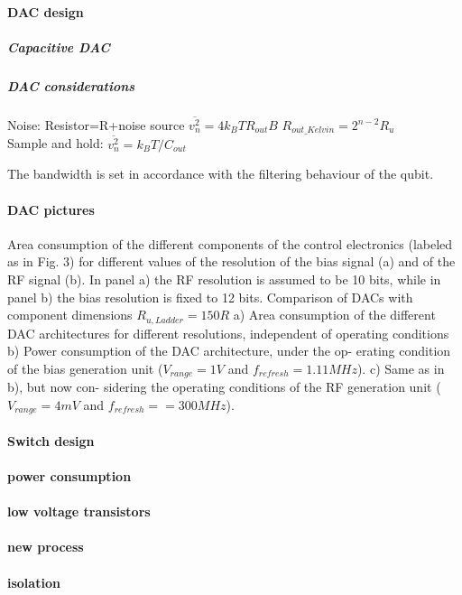\documentclass[a4paper,12pt]{article} %
\begin{document}
\paragraph{DAC design}
\subparagraph{Capacitive DAC}
\subparagraph{DAC considerations} Noise: Resistor=R+noise source  $ \overline{v_n^2} = 4k_BTR_{out}B  $ \hspace{2mm}
$R_{out\_Kelvin}=2^{n-2}R_u$ \\
Sample and hold: $\overline{v_n^2} = k_BT/C_{out}$


The bandwidth is set in accordance with the filtering behaviour of the qubit.


\paragraph{DAC pictures}
Area consumption of the different components of the
control electronics (labeled as in Fig. 3) for different values of
the resolution of the bias signal (a) and of the RF signal (b).
In panel a) the RF resolution is assumed to be 10 bits, while
in panel b) the bias resolution is fixed to 12 bits.
Comparison of DACs with component dimensions
 $R_{u,Ladder} = 150R$
a) Area consumption of the different DAC architectures for
different resolutions, independent of operating conditions b)
Power consumption of the DAC architecture, under the op-
erating condition of the bias generation unit ($V_{range} = 1 V$
and $f_{refresh} = 1.11 MHz$). c) Same as in b), but now con-
sidering the operating conditions of the RF generation unit
($V_{range} = 4 mV$ and $f_{refresh} = = 300 MHz$).

\paragraph{Switch design}

\paragraph{power consumption}

\paragraph{low voltage transistors}

\paragraph{new process}

\paragraph{isolation}
\end{document}
